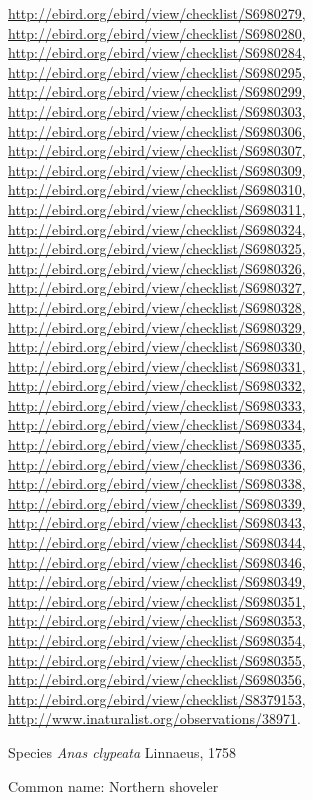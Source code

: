 \documentclass[9pt, article]{memoir}
\begin{document}
\begin{multicols}{2}
\url{http://ebird.org/ebird/view/checklist/S6980279}, 
\url{http://ebird.org/ebird/view/checklist/S6980280}, 
\url{http://ebird.org/ebird/view/checklist/S6980284}, 
\url{http://ebird.org/ebird/view/checklist/S6980295}, 
\url{http://ebird.org/ebird/view/checklist/S6980299}, 
\url{http://ebird.org/ebird/view/checklist/S6980303}, 
\url{http://ebird.org/ebird/view/checklist/S6980306}, 
\url{http://ebird.org/ebird/view/checklist/S6980307}, 
\url{http://ebird.org/ebird/view/checklist/S6980309}, 
\url{http://ebird.org/ebird/view/checklist/S6980310}, 
\url{http://ebird.org/ebird/view/checklist/S6980311}, 
\url{http://ebird.org/ebird/view/checklist/S6980324}, 
\url{http://ebird.org/ebird/view/checklist/S6980325}, 
\url{http://ebird.org/ebird/view/checklist/S6980326}, 
\url{http://ebird.org/ebird/view/checklist/S6980327}, 
\url{http://ebird.org/ebird/view/checklist/S6980328}, 
\url{http://ebird.org/ebird/view/checklist/S6980329}, 
\url{http://ebird.org/ebird/view/checklist/S6980330}, 
\url{http://ebird.org/ebird/view/checklist/S6980331}, 
\url{http://ebird.org/ebird/view/checklist/S6980332}, 
\url{http://ebird.org/ebird/view/checklist/S6980333}, 
\url{http://ebird.org/ebird/view/checklist/S6980334}, 
\url{http://ebird.org/ebird/view/checklist/S6980335}, 
\url{http://ebird.org/ebird/view/checklist/S6980336}, 
\url{http://ebird.org/ebird/view/checklist/S6980338}, 
\url{http://ebird.org/ebird/view/checklist/S6980339}, 
\url{http://ebird.org/ebird/view/checklist/S6980343}, 
\url{http://ebird.org/ebird/view/checklist/S6980344}, 
\url{http://ebird.org/ebird/view/checklist/S6980346}, 
\url{http://ebird.org/ebird/view/checklist/S6980349}, 
\url{http://ebird.org/ebird/view/checklist/S6980351}, 
\url{http://ebird.org/ebird/view/checklist/S6980353}, 
\url{http://ebird.org/ebird/view/checklist/S6980354}, 
\url{http://ebird.org/ebird/view/checklist/S6980355}, 
\url{http://ebird.org/ebird/view/checklist/S6980356}, 
\url{http://ebird.org/ebird/view/checklist/S8379153}, 
\url{http://www.inaturalist.org/observations/38971}.

\vspace{6pt}\noindent\hspace{36pt}Species \textit{Anas clypeata} Linnaeus, 1758


Common name: Northern shoveler


\end{multicols}
\end{document}
